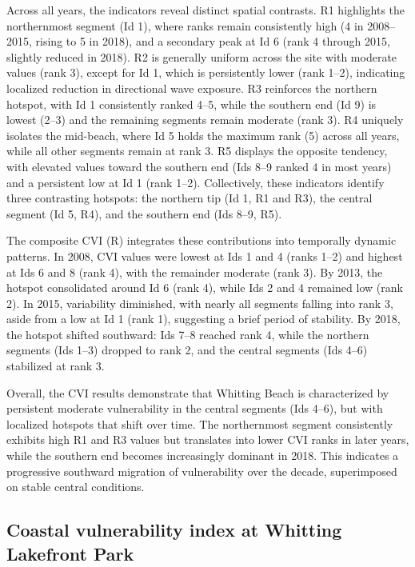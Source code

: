 Across all years, the indicators reveal distinct spatial contrasts. R1
highlights the northernmost segment (Id 1), where ranks remain consistently high
(4 in 2008–2015, rising to 5 in 2018), and a secondary peak at Id 6 (rank 4
through 2015, slightly reduced in 2018). R2 is generally uniform across the site
with moderate values (rank 3), except for Id 1, which is persistently lower
(rank 1–2), indicating localized reduction in directional wave exposure. R3
reinforces the northern hotspot, with Id 1 consistently ranked 4–5, while the
southern end (Id 9) is lowest (2–3) and the remaining segments remain moderate
(rank 3). R4 uniquely isolates the mid-beach, where Id 5 holds the maximum rank
(5) across all years, while all other segments remain at rank 3. R5 displays the
opposite tendency, with elevated values toward the southern end (Ids 8–9 ranked
4 in most years) and a persistent low at Id 1 (rank 1–2). Collectively, these
indicators identify three contrasting hotspots: the northern tip (Id 1, R1 and
R3), the central segment (Id 5, R4), and the southern end (Ids 8–9, R5).

The composite CVI (R) integrates these contributions into temporally dynamic
patterns. In 2008, CVI values were lowest at Ids 1 and 4 (ranks 1–2) and highest
at Ids 6 and 8 (rank 4), with the remainder moderate (rank 3). By 2013, the
hotspot consolidated around Id 6 (rank 4), while Ids 2 and 4 remained low (rank
2). In 2015, variability diminished, with nearly all segments falling into rank
3, aside from a low at Id 1 (rank 1), suggesting a brief period of stability. By
2018, the hotspot shifted southward: Ids 7–8 reached rank 4, while the northern
segments (Ids 1–3) dropped to rank 2, and the central segments (Ids 4–6)
stabilized at rank 3.

Overall, the CVI results demonstrate that Whitting Beach is characterized by
persistent moderate vulnerability in the central segments (Ids 4–6), but with
localized hotspots that shift over time. The northernmost segment consistently
exhibits high R1 and R3 values but translates into lower CVI ranks in later
years, while the southern end becomes increasingly dominant in 2018. This
indicates a progressive southward migration of vulnerability over the decade,
superimposed on stable central conditions.

\subsection{Coastal vulnerability index at Whitting Lakefront Park}
\label{Coastal vulnerability index at Whitting Lakefront Park}

